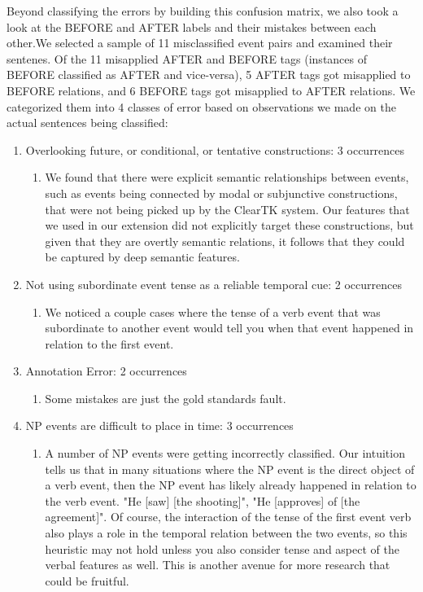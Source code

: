 \documentclass[11pt]{article}
\begin{document}
 Beyond classifying the errors by building this confusion matrix, we also took a look at the
BEFORE and AFTER labels and their mistakes between each other.We selected a sample of 11 misclassified event pairs and examined their sentenes. Of the 11 misapplied AFTER and BEFORE tags (instances
of BEFORE classified as AFTER and vice-versa), 5 AFTER tags got misapplied to BEFORE
relations, and 6 BEFORE tags got misapplied to AFTER relations. We
categorized them into 4 classes of error based on observations we made on the actual
sentences being classified:
\begin{enumerate}
\item Overlooking future, or conditional, or tentative constructions: 3 occurrences
\begin{enumerate}
\item We found that there were explicit semantic relationships between events, such as events being connected by modal or subjunctive constructions, that were not being picked up by the ClearTK system. Our features that we used in our extension did not explicitly target these constructions, but given that they are overtly semantic relations, it follows that they could be captured by deep semantic features. 
\end{enumerate}
\item Not using subordinate event tense as a reliable temporal cue: 2 occurrences
\begin{enumerate}
\item We noticed a couple cases where the tense of a verb event that was subordinate to another event would tell you when that event happened in relation to the first event. 
\end{enumerate}
\item Annotation Error: 2 occurrences
\begin{enumerate}
\item Some mistakes are just the gold standards fault.
\end{enumerate}
\item NP events are difficult to place in time: 3 occurrences
\begin{enumerate}
\item A number of NP events were getting incorrectly classified. Our intuition tells us that in many situations where the NP event is the direct object of a verb event, then the NP event has likely already happened in relation to the verb event. "He [saw] [the shooting]", "He [approves] of [the agreement]". Of course, the interaction of the tense of the first event verb also plays a role in the temporal relation between the two events, so this heuristic may not hold unless you also consider tense and aspect of the verbal features as well. This is another avenue for more research that could be fruitful.
\end{enumerate}
\end{enumerate}
\end{document}
